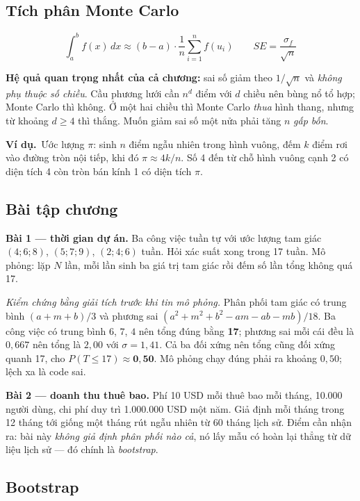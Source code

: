 \documentclass[11pt]{article}
\newcommand{\vd}{\textbf{Ví dụ.}\ }
\begin{document}
\subsection*{Tích phân Monte Carlo}

\[
\int_a^b f(x)\,dx \approx (b-a)\cdot\frac{1}{n}\sum_{i=1}^{n} f(u_i)
\qquad
SE = \frac{\sigma_f}{\sqrt n}
\]

\textbf{Hệ quả quan trọng nhất của cả chương:} sai số giảm theo $1/\sqrt n$ và
\emph{không phụ thuộc số chiều}. Cầu phương lưới cần $n^d$ điểm với $d$ chiều nên
bùng nổ tổ hợp; Monte Carlo thì không. Ở một hai chiều thì Monte Carlo \emph{thua}
hình thang, nhưng từ khoảng $d \ge 4$ thì thắng. Muốn giảm sai số một nửa phải
tăng $n$ \emph{gấp bốn}.

\vd Ước lượng $\pi$: sinh $n$ điểm ngẫu nhiên trong hình vuông, đếm $k$ điểm rơi
vào đường tròn nội tiếp, khi đó $\pi \approx 4k/n$. Số 4 đến từ chỗ hình vuông cạnh
2 có diện tích 4 còn tròn bán kính 1 có diện tích $\pi$.

\subsection*{Bài tập chương}

\textbf{Bài 1 --- thời gian dự án.} Ba công việc tuần tự với ước lượng tam giác
$(4;6;8)$, $(5;7;9)$, $(2;4;6)$ tuần. Hỏi xác suất xong trong 17 tuần. Mô phỏng:
lặp $N$ lần, mỗi lần sinh ba giá trị tam giác rồi đếm số lần tổng không quá 17.

\emph{Kiểm chứng bằng giải tích trước khi tin mô phỏng.} Phân phối tam giác có
trung bình $(a+m+b)/3$ và phương sai $(a^2+m^2+b^2-am-ab-mb)/18$. Ba công việc có
trung bình $6$, $7$, $4$ nên tổng đúng bằng \textbf{17}; phương sai mỗi cái đều là
$0{,}667$ nên tổng là $2{,}00$ với $\sigma = 1{,}41$. Cả ba đối xứng nên tổng cũng
đối xứng quanh 17, cho $P(T \le 17) \approx \mathbf{0{,}50}$. Mô phỏng chạy đúng
phải ra khoảng $0{,}50$; lệch xa là code sai.

\textbf{Bài 2 --- doanh thu thuê bao.} Phí 10 USD mỗi thuê bao mỗi tháng, 10.000
người dùng, chi phí duy trì 1.000.000 USD một năm. Giả định mỗi tháng trong 12
tháng tới giống một tháng rút ngẫu nhiên từ 60 tháng lịch sử. Điểm cần nhận ra:
bài này \emph{không giả định phân phối nào cả}, nó lấy mẫu có hoàn lại thẳng từ dữ
liệu lịch sử --- đó chính là \emph{bootstrap}.

\subsection*{Bootstrap}
\end{document}
